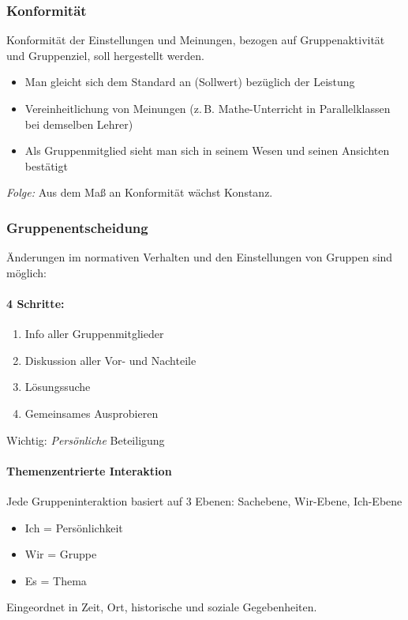 \documentclass[12pt]{scrartcl}
\DeclareRobustCommand{\zB}{z.\,B.\xspace}
\begin{document}
\subsubsection{Konformität}
Konformität der Einstellungen und Meinungen, bezogen auf Gruppenaktivität und
Gruppenziel, soll hergestellt werden.
\begin{itemize}
	\item Man gleicht sich dem Standard an (Sollwert) bezüglich der Leistung
	\item Vereinheitlichung von Meinungen (\zB Mathe-Unterricht in
		Parallelklassen bei demselben Lehrer)
	\item Als Gruppenmitglied sieht man sich in seinem Wesen und seinen
		Ansichten bestätigt
\end{itemize}
\emph{Folge:} Aus dem Maß an Konformität wächst Konstanz.

\subsubsection{Gruppenentscheidung}
Änderungen im normativen Verhalten und den Einstellungen von Gruppen sind
möglich:
\paragraph{4 Schritte:}
\begin{enumerate}
	\item Info aller Gruppenmitglieder
	\item Diskussion aller Vor- und Nachteile
	\item Lösungssuche
	\item Gemeinsames Ausprobieren
\end{enumerate}
Wichtig: \emph{Persönliche} Beteiligung

\paragraph{Themenzentrierte Interaktion}
Jede Gruppeninteraktion basiert auf 3 Ebenen: Sachebene, Wir-Ebene, Ich-Ebene
\begin{itemize}
	\item Ich = Persönlichkeit
	\item Wir = Gruppe
	\item Es = Thema
\end{itemize}
Eingeordnet in Zeit, Ort, historische und soziale Gegebenheiten.
\end{document}
